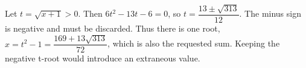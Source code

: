 Let $t=\sqrt{x+1}>0$. Then $6t^2-13t-6=0$, so $t=\dfrac{13\pm\sqrt{313}}{12}$. The minus sign is negative and must be discarded. Thus there is one root, $x=t^2-1=\boxed{\dfrac{169+13\sqrt{313}}{72}}$, which is also the requested sum. Keeping the negative t-root would introduce an extraneous value.
